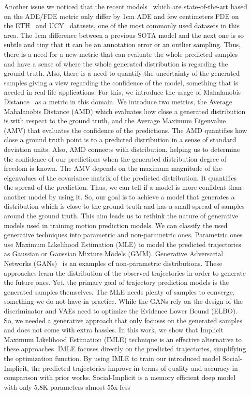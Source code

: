 \documentclass[runningheads]{llncs}
\begin{document}
Another issue we noticed that the recent models~\cite{salzmann2020trajectron++,zhao2021you,mangalam2021goals,liu2021social} which are state-of-the-art based on the ADE/FDE metric only differ by 1cm ADE and few centimeters FDE on the ETH~\cite{pellegrini2009you} and UCY~\cite{lerner2007crowds} datasets, one of the most commonly used datasets in this area. The 1cm difference between a previous SOTA model and the next one is so subtle and tiny that it can be an annotation error or an outlier sampling. Thus, there is a need for a new metric that can evaluate the whole predicted samples and have a sense of where the whole generated distribution is regarding the ground truth. Also, there is a need to quantify the uncertainty of the generated samples giving a view regarding the confidence of the model, something that is needed in real-life applications. For this, we introduce the usage of Mahalanobis Distance~\cite{mahalanobis1936generalized} as a metric in this domain. We introduce two metrics, the Average Mahalanobis Distance (AMD) which evaluates how close a generated distribution is with respect to the ground truth, and the Average Maximum Eigenvalue (AMV) that evaluates the confidence of the predictions. The AMD quantifies how close a ground truth point is to a predicted distribution in a sense of standard deviation units. Also, AMD connects with  distribution, helping us to determine the confidence of our predictions when the generated distribution degree of freedom is known. The AMV depends on the maximum magnitude of the eigenvalues of the covariance matrix of the predicted distribution. It quantifies the spread of the prediction. Thus, we can tell if a model is more confident than another model by using it. So, our goal is to achieve a model that generates a distribution which is close to the ground truth and has a small spread of samples around the ground truth. This aim leads us to rethink the nature of generative models used in training motion prediction models. We can classify the used generative techniques into parametric and non-parametric ones. Parametric ones use Maximum Likelihood Estimation (MLE) to model the predicted trajectories as Gaussian or Gaussian Mixture Models (GMM). Generative Adversarial Networks (GANs)~\cite{goodfellow2014generative} is an examples of non-parametric distributions. These approaches learn the distribution of the observed trajectories in order to generate the future ones. Yet, the primary goal of trajectory prediction models is the generated samples themselves. The MLE needs plenty of samples to converge, something we do not have in practice. While the GANs rely on the design of the discriminator and VAEs need to optimize the Evidence Lower Bound (ELBO). So, we needed a generative approach that only focuses on the generated samples and does not come with extra hassles. In this work, we show that Implicit Maximum Likelihood Estimation (IMLE) technique is an effective alternative to these approaches. IMLE focuses directly on the predicted trajectories, simplifying the optimization function. By using IMLE to train our introduced model Social-Implicit, the predicted trajectories improve in terms of quality and accuracy in comparison with prior works. Social-Implicit is a memory efficient deep model with only 5.8K parameters almost 55x less 
\end{document}

